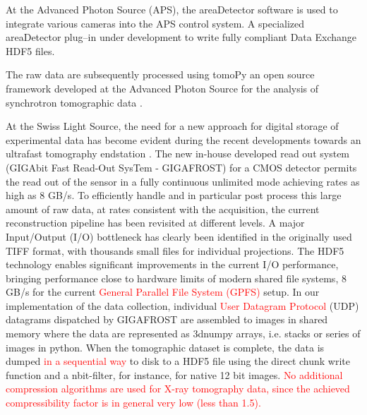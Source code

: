 \documentclass[pdf]{iucr}              %
\begin{document}
At the Advanced Photon Source (APS), the areaDetector software \cite{area_detector} is used to integrate various cameras into the APS control system. A specialized areaDetector plug--in under development to write fully compliant Data Exchange HDF5 files. 

The raw data are subsequently processed using tomoPy an open source framework developed at the Advanced Photon Source for the analysis of synchrotron tomographic data \cite{python_cpp}.

At the Swiss Light Source, the need for a new approach for digital storage of experimental data has become evident during the recent developments towards an ultrafast tomography endstation \cite{mokso2010}. The new in-house developed read out system (GIGAbit Fast Read-Out SysTem - GIGAFROST) for a CMOS detector permits the read out of the sensor in a fully continuous unlimited mode achieving rates as high as 8 GB/s. To efficiently handle and in particular post process this large amount of raw data, at rates consistent with the acquisition, the current reconstruction pipeline has been revisited at different levels. A major Input/Output (I/O) bottleneck has clearly been identified in the originally used TIFF format, with thousands small files for individual projections. The HDF5 technology enables significant improvements in the current I/O performance, bringing performance close to hardware limits of modern shared file systems, 8 GB/s for the current \textcolor{red}{General Parallel File System }\textcolor{red}{(GPFS)} setup. In our implementation of the data collection, individual \textcolor{red}{User Datagram Protocol} (UDP) datagrams dispatched by GIGAFROST are assembled to images in shared memory where the data are represented as 3dnumpy arrays, i.e. stacks or series of images in python. When the tomographic dataset is complete, the data is dumped \textcolor{red}{in a sequential way} to disk to a HDF5 file using the direct chunk write function \cite{donath2013} and a nbit-filter, for instance, for native 12 bit images. \textcolor{red}{ No additional compression algorithms are used for X-ray tomography data, since the achieved compressibility factor is in general very low (less than 1.5).}
\end{document}
